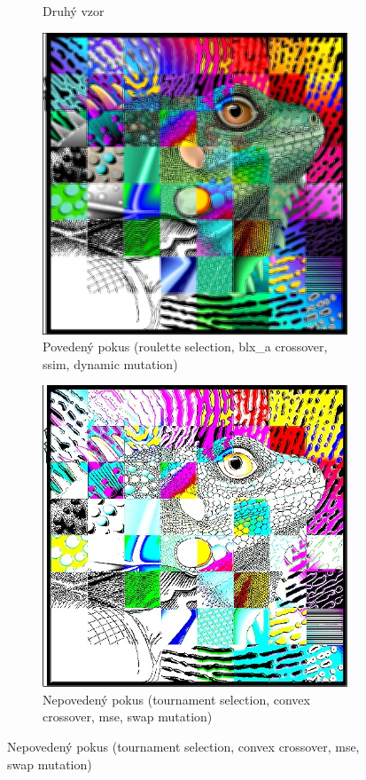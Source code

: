 \documentclass[a4paper,11pt]{scrartcl}
\begin{document}
\begin{figure}[!ht]
\begin{subfigure}[b]{0.4\textwidth}
        \caption{Druhý vzor}
        \label{fig:gull}
    \end{subfigure}
        \begin{subfigure}[b]{0.4\textwidth}
        \includegraphics[width=\textwidth]{img/roulette-blx_a-ssim-dynamic_example2.jpg}
        \caption{Povedený pokus (roulette selection, blx\_a crossover, ssim, dynamic mutation)}
        \label{fig:gull}
    \end{subfigure}
        \begin{subfigure}[b]{0.4\textwidth}
        \includegraphics[width=\textwidth]{img/tournament-convex-mse-swap_example2.jpg}
        \caption{Nepovedený pokus (tournament selection, convex crossover, mse, swap mutation)}
        \label{fig:gull}
    \end{subfigure}
\end{figure}
\end{document}
